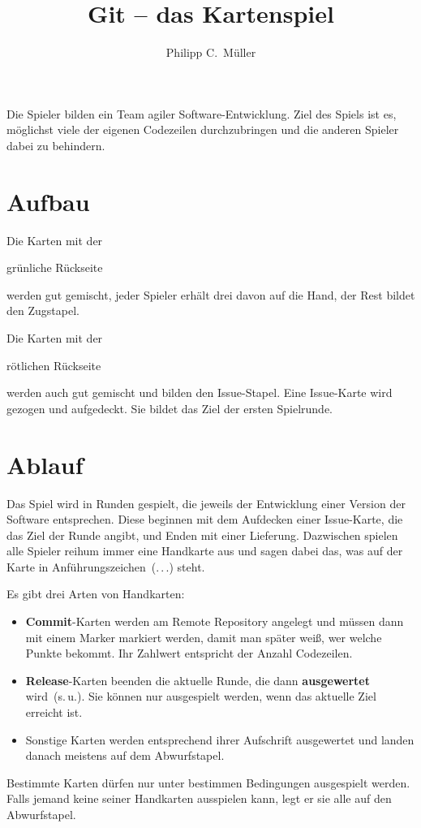 \documentclass[DIV=15, fontsize=11pt]{scrartcl}
\title{Git -- das Kartenspiel}
\author{Philipp C.\ Müller}
\newcommand\hugefont[1]{\raisebox{-5pt}{\fontsize{50}{60}\sffamily\bfseries\selectfont #1}}
\newcommand\bigfont[1]{{\fontsize{20}{24}\sffamily\bfseries\selectfont #1}}
\newcommand\textfontsize[1]{\fontsize{9}{10}\sffamily\selectfont #1}
\newcommand\rede[1]{\glqq #1\grqq{}}
\newcommand\textrule[1]{\textbf{#1}}
\newenvironment{CardFront}[1]{%
  \global\advance\cardnum by 1%
  \begin{tikzpicture}
    \draw[line width=\cardlinewidth, rounded corners=\cardborderradius, fill=white] (0,0) rectangle (\cardwidth,\cardheight) coordinate (URex);

    \path (0,0)--(\cardwidth,\cardheight) coordinate[midway] (Center);
    \path (URex)--+(-\cardborder,-\cardborder) coordinate[midway] (URmed) coordinate (UR);
    \coordinate (ULex) at (0,\cardheight);
    \coordinate (LRex) at (\cardwidth,0);
    
    \fill[bgcolor, rounded corners=\cardborderradius] (\cardborder,\cardborder) coordinate (LL) rectangle (UR);
    
    \path (LL)-|(UR) coordinate[midway] (LR);
    \path (LL)|-(UR) coordinate[midway] (UL);
    \path (UL)--(ULex) coordinate[midway] (ULmed);
    \path (LL)-|(UR) coordinate[midway] (LR);
    \path (LL)--(0,0) coordinate[midway] (LLmed);
    \path (LR)--(LRex) coordinate[midway] (LRmed);

    \path (Center)+(0,0.075\cardheight) coordinate (UCenter);
	
	\path (UCenter)+(0,0.25\cardheight) node {\bigfont{#1}};
}{
  \end{tikzpicture}%
  \ifnum\cardnum>2
	\global\cardnum=0

	\vskip-1pt
  \fi
}
\newcommand\CardTextField[1]{%
    \path (UCenter)+(0,-0.25\cardwidth-0.015\cardheight) node[anchor=north] {%
	\begin{minipage}{\cardtextwidth}
		\textfontsize\rightskip0pt minus 0.25em
		#1
	\end{minipage}};
}
\newcommand\CardFrontTikzBase[3]{%
	\begin{CardFront}{#1}
		#2
		
		\CardTextField{#3}
	\end{CardFront}%
}
\newcommand\CardFrontTikzCircle[4]{%
	\CardFrontTikzBase{#1}{%
		\draw[line width=1.5pt, fill=#3] (UCenter) circle[radius=0.25*\cardwidth];
		#2}{#4}%
}
\newcommand\CalcNumberColor[1]{%
	\ifnum#1<0
		\colorlet{numcolor}{errorcolor}%
	\else%
		\ifnum#1<8%
			\auxnum=#1
			\ifnum#1=0\else\advance\auxnum by -1\fi%
			\multiply\auxnum by 14
			\colorlet{numcolor}{middlecolor!\the\auxnum!nullcolor}%
		\else%
			\ifnum#1<32
				\auxnum=#1
				\advance\auxnum by -8
				\multiply\auxnum by 42
				\divide\auxnum by 10
				\colorlet{numcolor}{highcolor!\the\auxnum!middlecolor}%
			\else%
				\colorlet{numcolor}{highcolor}%
			\fi%
		\fi%
	\fi%
%
	\auxnum=#1
	\ifnum\auxnum<0\else%
		\ifnum\auxnum<16
			\def\sixteen{white}%
		\else%
			\def\sixteen{black}%
			\advance\auxnum by -16
		\fi%
		\ifnum\auxnum<8
			\def\eight{white}%
		\else%
			\def\eight{black}%
			\advance\auxnum by -8
		\fi%
		\ifnum\auxnum<4
			\def\four{white}%
		\else%
			\def\four{black}%
			\advance\auxnum by -4
		\fi%
		\ifnum\auxnum<2
			\def\two{white}%
		\else%
			\def\two{black}%
			\advance\auxnum by -2
		\fi%
		\ifnum\auxnum<1%
			\def\one{white}%
		\else%
			\def\one{black}%
		\fi%
	\fi%
	\auxnum=#1
}
\newcommand\DrawNumber[1][]{
	\ifnum\auxnum<0
		\path (UCenter)+(0,0.025\cardwidth) node[anchor=center] {#1\hugefont{X}};
	\else
		\path (UCenter)+(0,0.025\cardwidth) node[anchor=center] {#1\hugefont{\number\auxnum}};
		\ifnum\auxnum<16
			\path (UCenter)++(-0.09*\cardwidth,-0.125*\cardwidth) coordinate (aux);
		\else
			\path (UCenter)++(-0.12*\cardwidth,-0.125*\cardwidth) coordinate (aux);
			\draw[fill=\sixteen] (aux) circle[radius=1mm];
			\path (aux)++(0.06*\cardwidth,0) coordinate (aux);
		\fi
		\draw[fill=\eight] (aux) circle[radius=1mm];
		\path (aux)++(0.06*\cardwidth,0) coordinate (aux);
		\draw[fill=\four] (aux) circle[radius=1mm];
		\path (aux)++(0.06*\cardwidth,0) coordinate (aux);
		\draw[fill=\two] (aux) circle[radius=1mm];
		\path (aux)++(0.06*\cardwidth,0) coordinate (aux);
		\draw[fill=\one] (aux) circle[radius=1mm];
	\fi
}
\newcommand\DrawNumberBorder{%
	\ifnum\auxnum>0%
		\node[draw, line width=1pt, fill=numcolor, circle, inner sep=0pt, anchor=north west] at (ULmed) {\hphantom{\bigfont{0}}\clap{\bigfont{\number\auxnum}}\hphantom{\bigfont{0}}};%
		\node[draw, line width=1pt, fill=numcolor, circle, inner sep=0pt, anchor=north east] at (URmed) {\hphantom{\bigfont{0}}\clap{\bigfont{\number\auxnum}}\hphantom{\bigfont{0}}};%
		\node[draw, line width=1pt, fill=numcolor, circle, inner sep=0pt, anchor=north east, rotate=180] at (LLmed) {\hphantom{\bigfont{0}}\clap{\bigfont{\number\auxnum}}\hphantom{\bigfont{0}}};%
		\node[draw, line width=1pt, fill=numcolor, circle, inner sep=0pt, anchor=north west, rotate=180] at (LRmed) {\hphantom{\bigfont{0}}\clap{\bigfont{\number\auxnum}}\hphantom{\bigfont{0}}};%
	\fi
}
\newcommand\CardFrontCommit[2][\centering\rede{git push!}]{%
	\CalcNumberColor{#2}%
	\CardFrontTikzCircle{commit}{\DrawNumber\DrawNumberBorder}{numcolor}{#1}%
}
\begin{document}
\maketitle

Die Spieler bilden ein Team agiler Software-Entwicklung. Ziel des Spiels ist es, möglichst viele der eigenen Codezeilen durchzubringen und die anderen Spieler dabei zu behindern.



\section{Aufbau}\fboxsep=0pt
Die Karten mit der \colorbox{bgcolor1}{grünliche Rückseite\strut} werden gut gemischt, jeder Spieler erhält drei davon auf die Hand, der Rest bildet den Zugstapel.

Die Karten mit der \colorbox{bgcolor2}{rötlichen Rückseite\strut} werden auch gut gemischt und bilden den Issue-Stapel. Eine Issue-Karte wird gezogen und aufgedeckt. Sie bildet das Ziel der ersten Spielrunde.



\section{Ablauf}
Das Spiel wird in Runden gespielt, die jeweils der Entwicklung einer Version der Software entsprechen. Diese beginnen mit dem Aufdecken einer Issue-Karte, die das Ziel der Runde angibt, und Enden mit einer Lieferung. Dazwischen spielen alle Spieler reihum immer eine Handkarte aus und sagen dabei das, was auf der Karte in Anführungszeichen~(\rede{.\,.\,.}) steht.

Es gibt drei Arten von Handkarten:
\begin{itemize}
	\item \textrule{Commit}-Karten werden am Remote Repository angelegt und müssen dann mit einem Marker markiert werden, damit man später weiß, wer welche Punkte bekommt. Ihr Zahlwert entspricht der Anzahl Codezeilen.
	\item \textrule{Release}-Karten beenden die aktuelle Runde, die dann \textrule{ausgewertet} wird~(s.\,u.). Sie können nur ausgespielt werden, wenn das aktuelle Ziel erreicht ist.
	\item Sonstige Karten werden entsprechend ihrer Aufschrift ausgewertet und landen danach meistens auf dem Abwurfstapel.
\end{itemize}

Bestimmte Karten dürfen nur unter bestimmen Bedingungen ausgespielt werden. Falls jemand keine seiner Handkarten ausspielen kann, legt er sie alle auf den Abwurfstapel.
\end{document}
